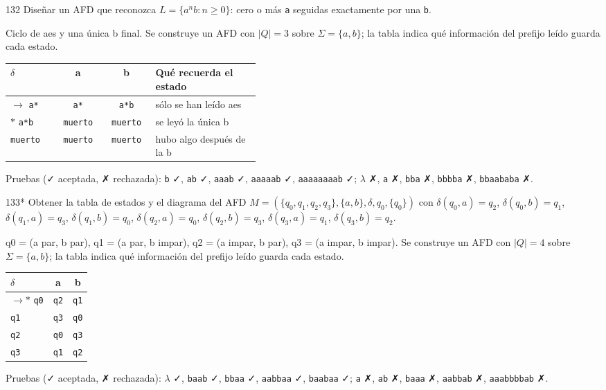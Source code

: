 \documentclass[11pt]{article}
\begin{document}
\begin{ejercicio}{132}{}
Diseñar un AFD que reconozca $L = \{a^n b : n \ge 0\}$: cero o más \texttt{a} seguidas exactamente por una \texttt{b}.
\end{ejercicio}
\proc Ciclo de aes y una única b final. Se construye un AFD con $|Q| = 3$ sobre $\Sigma = \{a, b\}$; la tabla indica qué información del prefijo leído guarda cada estado.
\begin{center}\small\begin{tabular}{lccp{0.42\linewidth}}\toprule
$\delta$ & a & b & Qué recuerda el estado \\\midrule
$\to$ \texttt{a*} & \texttt{a*} & \texttt{a*b} & sólo se han leído aes \\
$*$ \texttt{a*b} & \texttt{muerto} & \texttt{muerto} & se leyó la única b \\
 \texttt{muerto} & \texttt{muerto} & \texttt{muerto} & hubo algo después de la b \\
\bottomrule\end{tabular}\end{center}
Pruebas (✓ aceptada, ✗ rechazada): \texttt{b} ✓, \texttt{ab} ✓, \texttt{aaab} ✓, \texttt{aaaaab} ✓, \texttt{aaaaaaaab} ✓; $\lambda$ ✗, \texttt{a} ✗, \texttt{bba} ✗, \texttt{bbbba} ✗, \texttt{bbaababa} ✗.



\begin{ejercicio}{133}{*}
Obtener la tabla de estados y el diagrama del AFD $M = (\{q_0,q_1,q_2,q_3\}, \{a,b\}, \delta, q_0, \{q_0\})$ con $\delta(q_0,a)=q_2$, $\delta(q_0,b)=q_1$, $\delta(q_1,a)=q_3$, $\delta(q_1,b)=q_0$, $\delta(q_2,a)=q_0$, $\delta(q_2,b)=q_3$, $\delta(q_3,a)=q_1$, $\delta(q_3,b)=q_2$.
\end{ejercicio}
\proc q0 = (a par, b par), q1 = (a par, b impar), q2 = (a impar, b par), q3 = (a impar, b impar). Se construye un AFD con $|Q| = 4$ sobre $\Sigma = \{a, b\}$; la tabla indica qué información del prefijo leído guarda cada estado.
\begin{center}\small\begin{tabular}{lcc}\toprule
$\delta$ & a & b \\\midrule
$\to$$*$ \texttt{q0} & \texttt{q2} & \texttt{q1} \\
 \texttt{q1} & \texttt{q3} & \texttt{q0} \\
 \texttt{q2} & \texttt{q0} & \texttt{q3} \\
 \texttt{q3} & \texttt{q1} & \texttt{q2} \\
\bottomrule\end{tabular}\end{center}
Pruebas (✓ aceptada, ✗ rechazada): $\lambda$ ✓, \texttt{baab} ✓, \texttt{bbaa} ✓, \texttt{aabbaa} ✓, \texttt{baabaa} ✓; \texttt{a} ✗, \texttt{ab} ✗, \texttt{baaa} ✗, \texttt{aabbab} ✗, \texttt{aaabbbbab} ✗.
\end{document}
